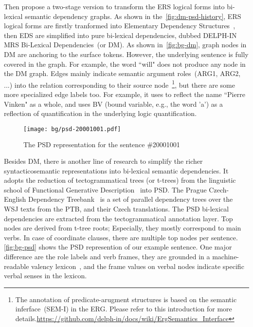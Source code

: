 Then \citet{Iva:Oep:Ovr:12} propose a two-stage version to transform
the ERS logical forms into bi-lexical semantic dependency graphs. As
shown in the~\autoref{fig:dm-psd-history}, ERS logical forms are
firstly tranformed into Elementary Dependency
Structures~\cite[EDS,][]{Oep:Lon:06}, then EDS are simplified into
pure bi-lexical dependencies, dubbed DELPH-IN MRS Bi-Lexical
Dependencies~(or DM). As shown in~\autoref{fig:bg-dm}, graph nodes in
DM are anchoring to the surface tokens. However, the underlying
sentence is fully covered in the graph. For example, the word ``will"
does not produce any node in the DM graph. Edges mainly indicate
semantic argument roles~(ARG1, ARG2, ...) into the relation
corresponding to their source node~\footnote{The annotation of
  predicate-arugment structures is based on the semantic
  inferface~(SEM-I) in the ERG. Please refer to this introduction for
  more
  details.\url{https://github.com/delph-in/docs/wiki/ErgSemantics_Interface}},
but there are some more specialized edge labels too. For example, it
uses  to reflect the name ``Pierre Vinken" as a whole,
and uses BV (bound variable, e.g., the word 'a') as a reflection of
quantification in the underlying logic quantification.

\begin{figure}[!th]
\centering
\texttt{[image: bg/psd-20001001.pdf]}
\caption{\label{fig:bg-psd}The PSD representation for the sentence
  \#20001001}
\end{figure}


 Besides DM, there is another
line of research to simplify the richer syntacticosemantic
representations into bi-lexical semantic dependencies.  It adopts the
reduction of tectogrammatical trees (or t-trees) from the linguistic
school of Functional Generative
Description~\citep[FGD,][]{Sga:Haj:Pan:86,hajic2012announcing} into
PSD. The Prague Czech-English Dependency
Treebank~\citep[PCEDT,][]{hajic2012announcing} is a set of parallel
dependency trees over the WSJ texts from the PTB, and their Czech
translations. The PSD bi-lexical dependencies are extracted from the
tectogrammatical annotation layer. Top nodes are derived from t-tree
roots; Especially, they mostly correspond to main verbs. In case of
coordinate clauses, there are multiple top nodes per
sentence. \autoref{fig:bg-psd} shows the PSD represention of our
example sentence. One major difference are the role labels and verb
frames, they are grounded in a machine-readable valency
lexicon~\citep{urevsova2016czengvallex}, and the frame values on
verbal nodes indicate specific verbal senses in the lexicon.

